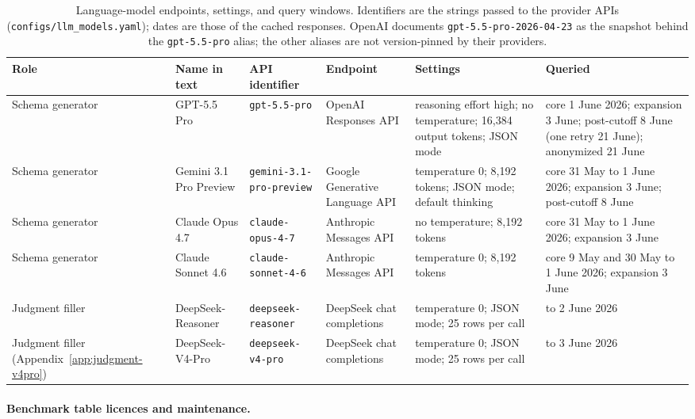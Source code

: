 \begin{table}[tbp]
\caption{Language-model endpoints, settings, and query windows. Identifiers are the strings passed to the provider APIs (\texttt{configs/llm\_models.yaml}); dates are those of the cached responses. OpenAI documents \texttt{gpt-5.5-pro-2026-04-23} as the snapshot behind the \texttt{gpt-5.5-pro} alias; the other aliases are not version-pinned by their providers.}\label{tab:models}
\centering
\scriptsize
\setlength{\tabcolsep}{4pt}
\begin{tabular}{>{\raggedright\arraybackslash}p{1.3cm}>{\raggedright\arraybackslash}p{1.6cm}>{\raggedright\arraybackslash}p{2.8cm}>{\raggedright\arraybackslash}p{2.0cm}>{\raggedright\arraybackslash}p{2.8cm}>{\raggedright\arraybackslash}p{3.0cm}}
\toprule
Role & Name in text & API identifier & Endpoint & Settings & Queried \\
\midrule
Schema generator & GPT-5.5 Pro & \texttt{gpt-5.5-pro} & OpenAI Responses API & reasoning effort high; no temperature; 16,384 output tokens; JSON mode & core 1 June 2026; expansion 3 June; post-cutoff 8 June (one retry 21 June); anonymized 21 June \\
Schema generator & Gemini 3.1 Pro Preview & \texttt{gemini-3.1-pro-}\allowbreak\texttt{preview} & Google Generative Language API & temperature 0; 8,192 tokens; JSON mode; default thinking & core 31 May to 1 June 2026; expansion 3 June; post-cutoff 8 June \\
Schema generator & Claude Opus 4.7 & \texttt{claude-opus-4-7} & Anthropic Messages API & no temperature; 8,192 tokens & core 31 May to 1 June 2026; expansion 3 June \\
Schema generator & Claude Sonnet 4.6 & \texttt{claude-sonnet-4-6} & Anthropic Messages API & temperature 0; 8,192 tokens & core 9 May and 30 May to 1 June 2026; expansion 3 June \\
Judgment filler & DeepSeek-Reasoner & \texttt{deepseek-}\allowbreak\texttt{reasoner} & DeepSeek chat completions & temperature 0; JSON mode; 25 rows per call & 1 to 2 June 2026 \\
Judgment filler (Appendix~\ref{app:judgment-v4pro}) & DeepSeek-V4-Pro & \texttt{deepseek-v4-pro} & DeepSeek chat completions & temperature 0; JSON mode; 25 rows per call & 1 to 3 June 2026 \\
\bottomrule
\end{tabular}
\end{table}

\paragraph{Benchmark table licences and maintenance.}

